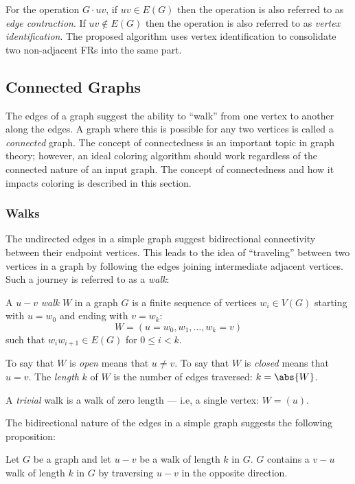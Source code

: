 For the operation \(G\cdot uv\), if \(uv\in E(G)\) then the operation is also referred to as \emph{edge
  contraction}.  If \(uv\notin E(G)\) then the operation is also referred to as \emph{vertex identification}.  The
proposed algorithm uses vertex identification to consolidate two non-adjacent FRs into the same part.

\subsection{Connected Graphs}

The edges of a graph suggest the ability to ``walk'' from one vertex to another along the edges.  A graph where this
is possible for any two vertices is called a \emph{connected} graph.  The concept of connectedness is an
important topic in graph theory; however, an ideal coloring algorithm should work regardless of the connected
nature of an input graph.  The concept of connectedness and how it impacts coloring is described in this section.

\subsubsection{Walks}

The undirected edges in a simple graph suggest bidirectional connectivity between their endpoint vertices.  This
leads to the idea of ``traveling'' between two vertices in a graph by following the edges joining intermediate
adjacent vertices.  Such a journey is referred to as a \emph{walk}:

\begin{definition}[Walk]
  A \(u-v\) \emph{walk} \(W\) in a graph \(G\) is a finite sequence of vertices \(w_i\in V(G)\) starting with
  \(u=w_0\) and ending with \(v=w_k\):
  \[W=(u=w_0,w_1,\ldots,w_k=v)\]
  such that \(w_iw_{i+1}\in E(G)\) for \(0\le i<k\).

  To say that \(W\) is \emph{open} means that \(u\ne v\).  To say that \(W\) is \emph{closed} means that \(u=v\).
  The \emph{length} \(k\) of \(W\) is the number of edges traversed: \(k=\abs{W}\).

  A \emph{trivial} walk is a walk of zero length --- i.e, a single vertex: \(W=(u)\).
\end{definition}

The bidirectional nature of the edges in a simple graph suggests the following proposition:

\begin{proposition}
  Let \(G\) be a graph and let \(u-v\) be a walk of length \(k\) in \(G\).  \(G\) contains a \(v-u\) walk of length
  \(k\) in \(G\) by traversing \(u-v\) in the opposite direction.
\end{proposition}

